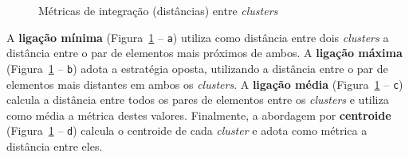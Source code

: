 \begin{figure}[h]
	\centering
	
	
	\caption{Métricas de integração (distâncias) entre \textit{clusters}}
	\label{fig:exemplos-distancias-cluster}
\end{figure}

A \textbf{ligação mínima} (Figura~\ref{fig:exemplos-distancias-cluster} -- \texttt{a}) utiliza como distância entre dois \textit{clusters} a distância entre o par de elementos mais próximos de ambos. A \textbf{ligação máxima} (Figura~\ref{fig:exemplos-distancias-cluster} -- \texttt{b}) adota a estratégia oposta, utilizando a distância entre o par de elementos mais distantes em ambos os \textit{clusters}. A \textbf{ligação média} (Figura~\ref{fig:exemplos-distancias-cluster} -- \texttt{c}) calcula a distância entre todos os pares de elementos entre os \textit{clusters} e utiliza como média a métrica destes valores. Finalmente, a abordagem por \textbf{centroide} (Figura~\ref{fig:exemplos-distancias-cluster} -- \texttt{d}) calcula o centroide de cada \textit{cluster} e adota como métrica a distância entre eles.

